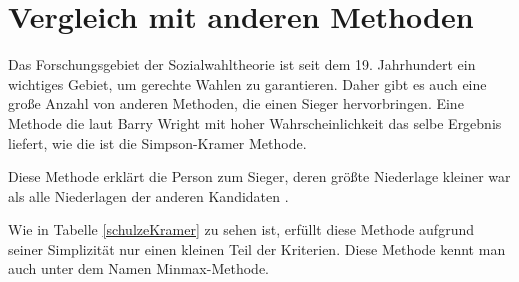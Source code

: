 \section{Vergleich mit anderen Methoden}
\label{sec:alternativeAlgorithmen}

Das Forschungsgebiet der Sozialwahltheorie ist seit dem 19. Jahrhundert ein wichtiges Gebiet, um gerechte Wahlen zu garantieren. Daher gibt es auch eine große Anzahl von anderen Methoden, die einen Sieger hervorbringen. Eine Methode die laut Barry Wright \citep{Wright2009} mit hoher Wahrscheinlichkeit das selbe Ergebnis liefert, wie die \schulze ist die Simpson-Kramer Methode.

Diese Methode erklärt die Person zum Sieger, deren größte Niederlage kleiner war als alle Niederlagen der anderen Kandidaten \citep{Nurmi2017}.  

Wie in Tabelle \ref{schulzeKramer} zu sehen ist, erfüllt diese Methode aufgrund seiner Simplizität nur einen kleinen Teil der Kriterien. Diese Methode kennt man auch unter dem Namen Minmax-Methode.

